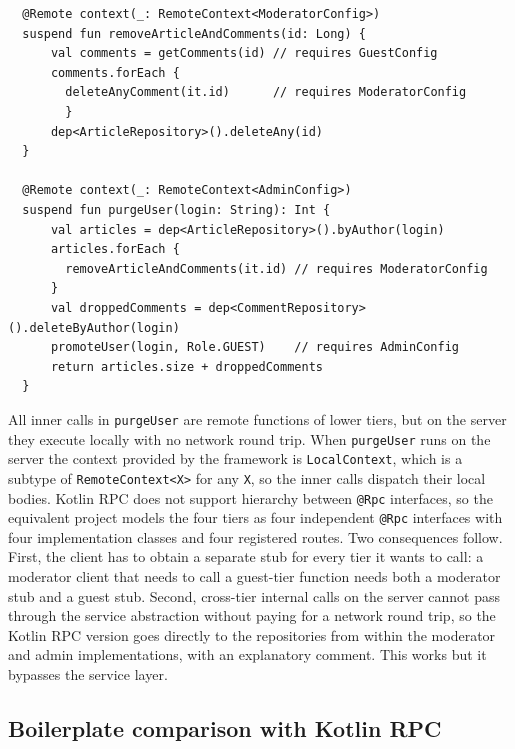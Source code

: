 \documentclass[a4paper,11pt,oneside]{article}
\newcommand{\kotlini}[1]{\texttt{#1}}
\begin{document}
\begin{listing}[!h]
  \begin{verbatim}
  @Remote context(_: RemoteContext<ModeratorConfig>)
  suspend fun removeArticleAndComments(id: Long) {
      val comments = getComments(id) // requires GuestConfig
      comments.forEach { 
        deleteAnyComment(it.id)      // requires ModeratorConfig
        } 
      dep<ArticleRepository>().deleteAny(id)
  }

  @Remote context(_: RemoteContext<AdminConfig>)
  suspend fun purgeUser(login: String): Int {
      val articles = dep<ArticleRepository>().byAuthor(login)
      articles.forEach { 
        removeArticleAndComments(it.id) // requires ModeratorConfig
      }
      val droppedComments = dep<CommentRepository>().deleteByAuthor(login)
      promoteUser(login, Role.GUEST)    // requires AdminConfig
      return articles.size + droppedComments
  }
  \end{verbatim}
  \caption{Cross-tier internal composition in CMS}\label{cms_purge_user}
\end{listing}

All inner calls in \kotlini{purgeUser} are remote functions of lower tiers, but on the server
they execute locally with no network round trip. When \kotlini{purgeUser} runs on the server
the context provided by the framework is \kotlini{LocalContext}, which is a subtype of
\kotlini{RemoteContext<X>} for any \kotlini{X}, so the inner calls dispatch their local bodies.
Kotlin RPC does not support hierarchy between \kotlini{@Rpc} interfaces, so the equivalent
project models the four tiers as four independent \kotlini{@Rpc} interfaces with four
implementation classes and four registered routes. Two consequences follow. First, the client
has to obtain a separate stub for every tier it wants to call: a moderator client that needs to
call a guest-tier function needs both a moderator stub and a guest stub. Second, cross-tier
internal calls on the server cannot pass through the service abstraction without paying for a
network round trip, so the Kotlin RPC version goes directly to the repositories from within
the moderator and admin implementations, with an explanatory comment. This works but it
bypasses the service layer.

\subsection{Boilerplate comparison with Kotlin RPC}\label{boilerplate_section}
\end{document}
